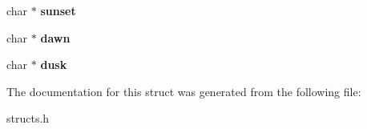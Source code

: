 \begin{DoxyCompactItemize}
\item 
\hypertarget{structzone__data_acedb6dd726d2637ed218ac4ae62a15cc}{char $\ast$ {\bfseries sunset}}\label{structzone__data_acedb6dd726d2637ed218ac4ae62a15cc}

\item 
\hypertarget{structzone__data_ad5bab9b03ac5514d88fd0485a9e3cd3f}{char $\ast$ {\bfseries dawn}}\label{structzone__data_ad5bab9b03ac5514d88fd0485a9e3cd3f}

\item 
\hypertarget{structzone__data_aeaf3002524c4db2a3b9f21088bb5be4e}{char $\ast$ {\bfseries dusk}}\label{structzone__data_aeaf3002524c4db2a3b9f21088bb5be4e}

\end{DoxyCompactItemize}


The documentation for this struct was generated from the following file\-:\begin{DoxyCompactItemize}
\item 
structs.\-h\end{DoxyCompactItemize}
